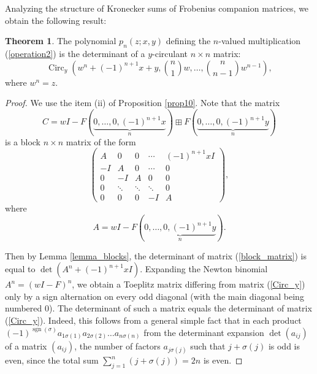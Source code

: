 \documentclass[14pt, dvipsnames]{extarticle}
\theoremstyle{definition}
\newtheorem{theorem}{Theorem}
\theoremstyle{definition}
\theoremstyle{remark}
\DeclareMathOperator{\sgn}{\mathrm{sgn}}
\DeclareMathOperator{\Circ}{\mathrm{Circ}}
\begin{document}
Analyzing the structure of Kronecker sums of Frobenius companion matrices, we obtain the following result:

\begin{theorem}\label{xyz_Wendt_det}
The polynomial $p_n(z; x, y)$ defining the $n$-valued multiplication (\ref{operation2}) is the determinant of a $y$-circulant $n\times n$ matrix:
\begin{equation}\label{Circ_y}
\Circ_{y}\left(w^n + (-1)^{n+1}x + y, \binom{n}{1}w, \dots, \binom{n}{n-1}w^{n-1}\right),
\end{equation}
where $w^n = z$.
\end{theorem}

\begin{proof}
We use the item (ii) of Proposition \ref{prop10}. Note that the matrix
$$C = wI - F(\underset{n}{\underbrace{0,\dots,0,(-1)^{n+1}x}})\boxplus F(\underset{n}{\underbrace{0,\dots,0,(-1)^{n+1}y}})$$
is a block $n\times n$ matrix of the form
\begin{equation}\label{block_matrix}
\left(\begin{array}{ccccc}
A & 0 & 0 & \cdots & (-1)^{n+1}xI\\
-I & A & 0 & \cdots & 0\\
0 & -I & A & 0 & 0\\
0 & \ddots & \ddots & \ddots & 0\\
0 & 0 & 0 & -I & A
\end{array}\right),
\end{equation}
where
\begin{equation}\label{matrix_A}
A = wI - F(\underset{n}{\underbrace{0,\dots,0,(-1)^{n+1}y}}).
\end{equation}

Then by Lemma \ref{lemma_blocks}, the determinant of matrix (\ref{block_matrix}) is equal to $\det(A^n + (-1)^{n+1}xI)$. Expanding the Newton binomial $A^n = (wI - F)^n$, we obtain a Toeplitz matrix differing from matrix (\ref{Circ_y}) only by a sign alternation on every odd diagonal (with the main diagonal being numbered 0). The determinant of such a matrix equals the determinant of matrix (\ref{Circ_y}). Indeed, this follows from a general simple fact that in each product $(-1)^{\sgn(\sigma)}a_{1\sigma(1)}a_{2\sigma(2)}\dots a_{n\sigma(n)}$ from the determinant expansion $\det(a_{ij})$ of a matrix $(a_{ij})$, the number of factors $a_{j\sigma(j)}$ such that $j + \sigma(j)$ is odd is even, since the total sum $\sum\limits_{j=1}^n (j+\sigma(j)) = 2n$ is even.     
\end{proof}
\end{document}
